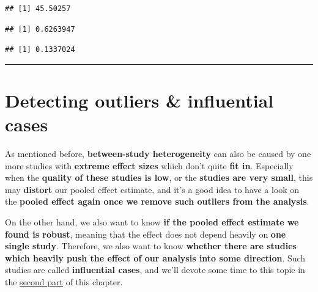 \documentclass[]{book}
\newenvironment{Shaded}{\begin{snugshade}}{\end{snugshade}}
\newcommand{\DecValTok}[1]{\textcolor[rgb]{0.00,0.00,0.81}{#1}}
\newcommand{\NormalTok}[1]{#1}
\newcommand{\OperatorTok}[1]{\textcolor[rgb]{0.81,0.36,0.00}{\textbf{#1}}}
\begin{document}
\begin{Shaded}
\end{Shaded}

\begin{verbatim}
## [1] 45.50257
\end{verbatim}

\begin{Shaded}
\end{Shaded}

\begin{verbatim}
## [1] 0.6263947
\end{verbatim}

\begin{Shaded}
\end{Shaded}

\begin{verbatim}
## [1] 0.1337024
\end{verbatim}

\begin{center}\rule{0.5\linewidth}{\linethickness}\end{center}

\hypertarget{detecting-outliers-influential-cases}{%
\section{Detecting outliers \& influential cases}\label{detecting-outliers-influential-cases}}

As mentioned before, \textbf{between-study heterogeneity} can also be caused by one more studies with \textbf{extreme effect sizes} which don't quite \textbf{fit in}. Especially when the \textbf{quality of these studies is low}, or the \textbf{studies are very small}, this may \textbf{distort} our pooled effect estimate, and it's a good idea to have a look on the \textbf{pooled effect again once we remove such outliers from the analysis}.

On the other hand, we also want to know \textbf{if the pooled effect estimate we found is robust}, meaning that the effect does not depend heavily on \textbf{one single study}. Therefore, we also want to know \textbf{whether there are studies which heavily push the effect of our analysis into some direction}. Such studies are called \textbf{influential cases}, and we'll devote some time to this topic in the \protect\hyperlink{influenceanalyses}{second part} of this chapter.
\end{document}
